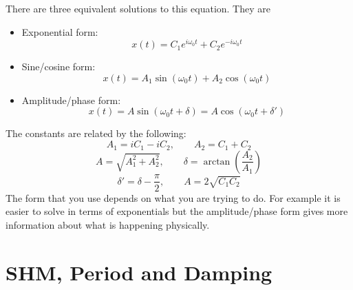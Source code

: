 \documentclass{article}
\begin{document}
    There are three equivalent solutions to this equation.
    They are
    \begin{itemize}
        \item Exponential form:
        \[x(t) = C_1e^{i\omega_0 t} + C_2e^{-i\omega_0 t}\]
        \item Sine/cosine form:
        \[x(t) = A_1\sin(\omega_0 t) + A_2\cos(\omega_0 t)\]
        \item Amplitude/phase form:
        \[x(t) = A\sin(\omega_0t + \delta) = A\cos(\omega_0t + \delta')\]
    \end{itemize}
    The constants are related by the following:
    \[A_1 = iC_1 - iC_2,\qquad A_2 = C_1 + C_2\]
    \[A = \sqrt{A_1^2 + A_2^2},\qquad \delta = \arctan\left(\frac{A_2}{A_1}\right)\]
    \[\delta' = \delta - \frac{\pi}{2},\qquad A = 2\sqrt{C_1C_2}\]
    The form that you use depends on what you are trying to do.
    For example it is easier to solve in terms of exponentials but the amplitude/phase form gives more information about what is happening physically.
    
    \section{SHM, Period and Damping}
\end{document}
